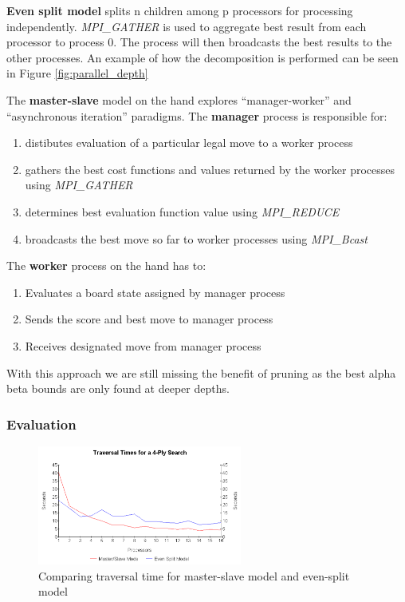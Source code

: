 \documentclass[12pt]{article}
\begin{document}
\textbf{Even split model} splits n children among p processors for processing
independently. \textit{MPI\_GATHER} is used to aggregate best result from each
processor to process 0. The process will then broadcasts the best results to the
other processes. An example of how the decomposition is performed can be seen in
Figure \ref{fig:parallel_depth}

The \textbf{master-slave} model on the hand explores \enquote{manager-worker} and \enquote{asynchronous
  iteration} paradigms. The \textbf{manager} process is responsible
for:

\begin{enumerate}
  \item distibutes evaluation of a particular legal move to a worker process
  \item gathers the best cost functions and values returned by the worker
    processes using \textit{MPI\_GATHER}
  \item determines best evaluation function value using \textit{MPI\_REDUCE}
  \item broadcasts the best move so far to worker processes using \textit{MPI\_Bcast}
\end{enumerate}


\noindent The \textbf{worker} process on the hand has to:
 
\begin{enumerate}
  \item Evaluates a board state assigned by manager process
  \item Sends the score and best move to manager process
  \item Receives designated move from manager process
\end{enumerate}


\noindent With this approach we are still missing the benefit of pruning as the
best alpha beta bounds are only found at deeper depths.


\subsubsection{Evaluation}

\begin{figure}[H]
  \centering
  \includegraphics[width=0.6\textwidth, height=0.4\textwidth]{traversal_model.png}
  \caption{Comparing traversal time for master-slave model and even-split model}
  \label{fig:traversal_model}
\end{figure}
\end{document}
